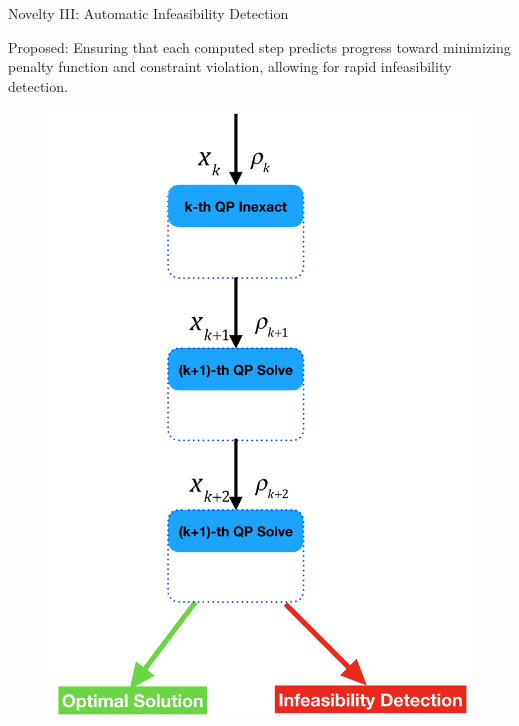 \documentclass[8pt]{beamer}
\begin{document}
 


\begin{frame}[c]{Novelty III: Automatic Infeasibility Detection}

\vfill

{\red 
\leftpointright Proposed:} Ensuring that each computed step predicts progress toward minimizing penalty function and constraint violation,   allowing for rapid {\red infeasibility detection.}

\vfill

 \begin{figure}[H]
\includegraphics[scale=0.15]{pic/autoInf}
\end{figure}

\end{frame}

 

 
 
\end{document}
